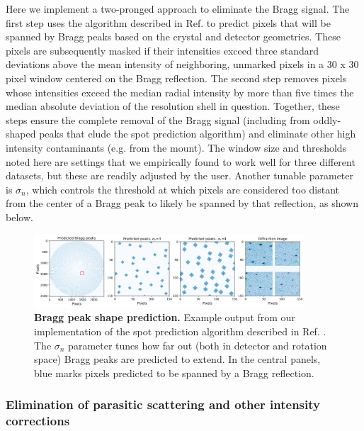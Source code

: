 \documentclass{article}
\begin{document}
Here we implement a two-pronged approach to eliminate the Bragg signal. The first step uses the algorithm described in Ref. \cite{pmid20124693} to predict pixels that will be spanned by Bragg peaks based on the crystal and detector geometries. These pixels are subsequently masked if their intensities exceed three standard deviations above the mean intensity of neighboring, unmarked pixels in a 30 x 30 pixel window centered on the Bragg reflection. The second step removes pixels whose intensities exceed the median radial intensity by more than five times the median absolute deviation of the resolution shell in question. Together, these steps ensure the complete removal of the Bragg signal (including from oddly-shaped peaks that elude the spot prediction algorithm) and eliminate other high intensity contaminants (e.g. from the mount). The window size and thresholds noted here are settings that we empirically found to work well for three different datasets, but these are readily adjusted by the user. Another tunable parameter is $\sigma_n$, which controls the threshold at which pixels are considered too distant from the center of a Bragg peak to likely be spanned by that reflection, as shown below.

\begin{figure}[htb!]
\centering
\includegraphics[width=0.9\textwidth]{figures/bragg_masks.png}
\caption{\textbf{Bragg peak shape prediction.} Example output from our implementation of the spot prediction algorithm described in Ref. \cite{pmid20124693}. The $\sigma_n$ parameter tunes how far out (both in detector and rotation space) Bragg peaks are predicted to extend. In the central panels, blue marks pixels predicted to be spanned by a Bragg reflection. }\label{bragg_masks}
\end{figure}

\subsubsection{Elimination of parasitic scattering and other intensity corrections}
\end{document}
